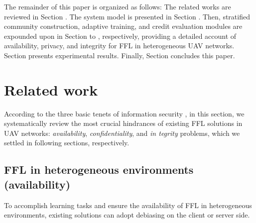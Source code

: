\documentclass[lettersize,journal]{IEEEtran}
\begin{document}
The remainder of this paper is organized as follows: The related works are reviewed in Section \uppercase\expandafter{}. The system model is presented in Section \uppercase\expandafter{}. Then, stratified community construction, adaptive training, and credit evaluation modules are expounded upon in Section \uppercase\expandafter{} to \uppercase\expandafter{}, respectively, providing a detailed account of availability, privacy, and integrity for FFL in heterogeneous UAV networks. Section \uppercase\expandafter{} presents experimental results. Finally, Section \uppercase\expandafter{} concludes this paper. %



\section{Related work}






According to the three basic tenets of information security \cite{zhou2021augmented-globecom}, in this section, we systematically review the most crucial hindrances of existing FFL solutions in UAV networks: \textit{availability}, \textit{confidentiality}, and \textit{in tegrity} problems, which we settled in following sections, respectively. 
\subsection{FFL in heterogeneous environments (availability)}
To accomplish learning tasks and ensure the availability of FFL in heterogeneous environments, existing solutions can adopt debiasing on the client or server side.
\end{document}
